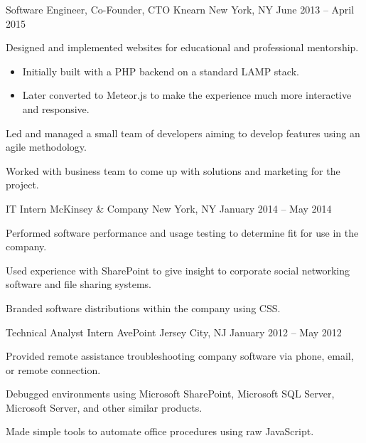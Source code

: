 \begin{cventries}
	\cventry
		{Software Engineer, Co-Founder, CTO} %
		{Knearn} %
		{New York, NY} %
		{June 2013 – April 2015} %
		{
			\begin{cvitems} %
				\item {Designed and implemented websites for educational and professional mentorship.}
				\begin{itemize}
					\item {Initially built with a PHP backend on a standard LAMP stack.}
					\item {Later converted to Meteor.js to make the experience much more interactive and responsive.}
				\end{itemize}
				\item {Led and managed a small team of developers aiming to develop features using an agile methodology.}
				\item {Worked with business team to come up with solutions and marketing for the project.}
			\end{cvitems}
		}

	\cventry
		{IT Intern} %
		{McKinsey \& Company} %
		{New York, NY} %
		{January 2014 – May 2014} %
		{
			\begin{cvitems} %
				\item {Performed software performance and usage testing to determine fit for use in the company.}
				\item {Used experience with SharePoint to give insight to corporate social networking software and file sharing systems.}
				\item {Branded software distributions within the company using CSS.}
			\end{cvitems}
		}

	\cventry
		{Technical Analyst Intern} %
		{AvePoint} %
		{Jersey City, NJ} %
		{January 2012 – May 2012} %
		{
			\begin{cvitems} %
				\item {Provided remote assistance troubleshooting company software via phone, email, or remote connection.}
				\item {Debugged environments using Microsoft SharePoint, Microsoft SQL Server, Microsoft Server, and other similar products.}
				\item {Made simple tools to automate office procedures using raw JavaScript.}
			\end{cvitems}
		}


\end{cventries}

